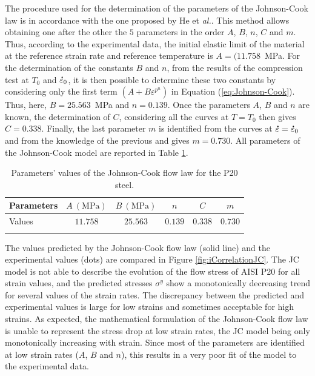 \documentclass[twoside,english,1p,final,sort&compress]{elsarticle}
\makeatletter
\theoremstyle{plain}
\newcommand{\mdot}[1]{\accentset{\mbox{\bfseries .}}{#1}}
\newcommand*{\eal}{et \emph{al.}\@\xspace}
\makeatother
\begin{document}
The procedure used for the determination of the parameters of the Johnson-Cook law is in accordance with the one proposed by He \eal \cite{He-2013}.
This method allows obtaining one after the other the $5$ parameters in the order $A$, $B$, $n$, $C$ and $m$.
Thus, according to the experimental data, the initial elastic limit of the material at the reference strain rate and reference temperature is $A=(11.758$~MPa.
For the determination of the constants $B$ and $n$, from the results of the compression test at $T_0$ and $\mdot\varepsilon_0$, it is then possible to determine these two constants by considering only the first term $\left(A+B\varepsilon^{p^{n}}\right)$ in Equation (\ref{eq:Johnson-Cook}).
Thus, here, $B=25.563$~MPa and $n=0.139$.
Once the parameters $A$, $B$ and $n$ are known, the determination of $C$, considering all the curves at $T=T_0$ then gives $C=0.338$.
Finally, the last parameter $m$ is identified from the curves at $\mdot\varepsilon=\mdot\varepsilon_0$ and from the knowledge of the previous and gives $m=0.730$.
All parameters of the Johnson-Cook model are reported in Table \ref{tab:JCparams}.

\begin{table}[h!]
\centering{}
\caption{Parameters' values of the Johnson-Cook flow law for the P20 steel.}
\begin{tabular}{lccccc}
\hline
Parameters & $A~(\text{MPa})$ & $B~(\text{MPa})$ & $n$ & $C$ & $m$\\ \hline
Values & $11.758$ & $25.563$ &  $0.139$ & $0.338$ & $0.730$\\ \hline
\label{tab:JCparams}
\end{tabular}
\end{table}

The values predicted by the Johnson-Cook flow law (solid line) and the experimental values (dots) are compared in Figure \ref{fig:iCorrelationJC}.
The JC model is not able to describe the evolution of the flow stress of AISI P20 for all strain values, and the predicted stresses $\sigma^y$ show a monotonically decreasing trend for several values of the strain rates.
The discrepancy between the predicted and experimental values is large for low strains and sometimes acceptable for high strains.
As expected, the mathematical formulation of the Johnson-Cook flow law is unable to represent the stress drop at low strain rates, the JC model being only monotonically increasing with strain.
Since most of the parameters are identified at low strain rates ($A$, $B$ and $n$), this results in a very poor fit of the model to the experimental data.
\end{document}
